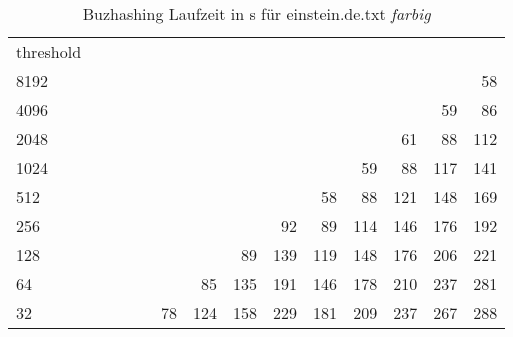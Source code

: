\begin{table}[h]
	\caption{Buzhashing Laufzeit in s für einstein.de.txt \emph{farbig}}
	\label{tab:my-table}
	\begin{tabular}{lrrrrrrrrrrrrr}
		\multicolumn{1}{r}{threshold} &  &  &  &  &  &  &  &  &  &  &  &  &  \\ \cline{1-1}
		\multicolumn{1}{|l|}{8192} &  &  &  &  &  &  &  &  &  &  &  &  & \cellcolor[HTML]{99E600}58 \\ \cline{1-1}
		\multicolumn{1}{|l|}{4096} &  &  &  &  &  &  &  &  &  &  &  & \cellcolor[HTML]{99E600}59 & \cellcolor[HTML]{99E600}86 \\ \cline{1-1}
		\multicolumn{1}{|l|}{2048} &  &  &  &  &  &  &  &  &  &  & \cellcolor[HTML]{99E600}61 & \cellcolor[HTML]{99E600}88 & \cellcolor[HTML]{99E600}112 \\ \cline{1-1}
		\multicolumn{1}{|l|}{1024} &  &  &  &  &  &  &  &  &  & \cellcolor[HTML]{99E600}59 & \cellcolor[HTML]{99E600}88 & \cellcolor[HTML]{99E600}117 & \cellcolor[HTML]{E69900}141 \\ \cline{1-1}
		\multicolumn{1}{|l|}{512} &  &  &  &  &  &  &  &  & \cellcolor[HTML]{99E600}58 & \cellcolor[HTML]{99E600}88 & \cellcolor[HTML]{99E600}121 & \cellcolor[HTML]{E69900}148 & \cellcolor[HTML]{E69900}169 \\ \cline{1-1}
		\multicolumn{1}{|l|}{256} &  &  &  &  &  &  &  & \cellcolor[HTML]{99E600}92 & \cellcolor[HTML]{99E600}89 & \cellcolor[HTML]{99E600}114 & \cellcolor[HTML]{E69900}146 & \cellcolor[HTML]{E69900}176 & \cellcolor[HTML]{E60000}192 \\ \cline{1-1}
		\multicolumn{1}{|l|}{128} &  &  &  &  &  &  & \cellcolor[HTML]{99E600}89 & \cellcolor[HTML]{E69900}139 & \cellcolor[HTML]{99E600}119 & \cellcolor[HTML]{E69900}148 & \cellcolor[HTML]{E69900}176 & \cellcolor[HTML]{E60000}206 & \cellcolor[HTML]{E60000}221 \\ \cline{1-1}
		\multicolumn{1}{|l|}{64} &  &  &  &  &  & \cellcolor[HTML]{99E600}85 & \cellcolor[HTML]{E69900}135 & \cellcolor[HTML]{E69900}191 & \cellcolor[HTML]{E69900}146 & \cellcolor[HTML]{E69900}178 & \cellcolor[HTML]{E60000}210 & \cellcolor[HTML]{E60000}237 & \cellcolor[HTML]{9900E6}281 \\ \cline{1-1}
		\multicolumn{1}{|l|}{32} &  &  &  &  & \cellcolor[HTML]{99E600}78 & \cellcolor[HTML]{99E600}124 & \cellcolor[HTML]{E69900}158 & \cellcolor[HTML]{E60000}229 & \cellcolor[HTML]{E69900}181 & \cellcolor[HTML]{E60000}209 & \cellcolor[HTML]{E60000}237 & \cellcolor[HTML]{9900E6}267 & \cellcolor[HTML]{9900E6}288 \\ \cline{1-1}

\end{tabular}
\end{table}
